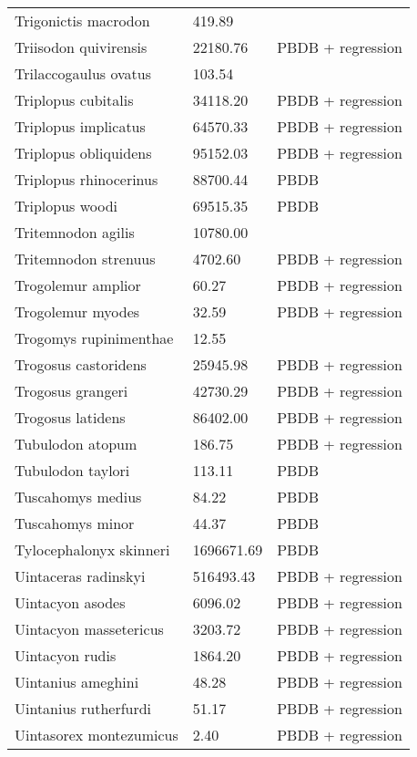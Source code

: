 \documentclass{article}
\begin{document}
\begin{center}
\begin{longtable}{p{} p{} p{} }
  Trigonictis macrodon & 419.89 & \cite{Tomiya2013} \\ 
  Triisodon quivirensis & 22180.76 & PBDB + regression \\ 
  Trilaccogaulus ovatus & 103.54 & \cite{Tomiya2013} \\ 
  Triplopus cubitalis & 34118.20 & PBDB + regression \\ 
  Triplopus implicatus & 64570.33 & PBDB + regression \\ 
  Triplopus obliquidens & 95152.03 & PBDB + regression \\ 
  Triplopus rhinocerinus & 88700.44 & PBDB \\ 
  Triplopus woodi & 69515.35 & PBDB \\ 
  Tritemnodon agilis & 10780.00 & \cite{Egi2001} \\ 
  Tritemnodon strenuus & 4702.60 & PBDB + regression \\ 
  Trogolemur amplior & 60.27 & PBDB + regression \\ 
  Trogolemur myodes & 32.59 & PBDB + regression \\ 
  Trogomys rupinimenthae & 12.55 & \cite{Tomiya2013} \\ 
  Trogosus castoridens & 25945.98 & PBDB + regression \\ 
  Trogosus grangeri & 42730.29 & PBDB + regression \\ 
  Trogosus latidens & 86402.00 & PBDB + regression \\ 
  Tubulodon atopum & 186.75 & PBDB + regression \\ 
  Tubulodon taylori & 113.11 & PBDB \\ 
  Tuscahomys medius & 84.22 & PBDB \\ 
  Tuscahomys minor & 44.37 & PBDB \\ 
  Tylocephalonyx skinneri & 1696671.69 & PBDB \\ 
  Uintaceras radinskyi & 516493.43 & PBDB + regression \\ 
  Uintacyon asodes & 6096.02 & PBDB + regression \\ 
  Uintacyon massetericus & 3203.72 & PBDB + regression \\ 
  Uintacyon rudis & 1864.20 & PBDB + regression \\ 
  Uintanius ameghini & 48.28 & PBDB + regression \\ 
  Uintanius rutherfurdi & 51.17 & PBDB + regression \\ 
  Uintasorex montezumicus & 2.40 & PBDB + regression \\ 

\end{longtable}
\end{center}
\end{document}
